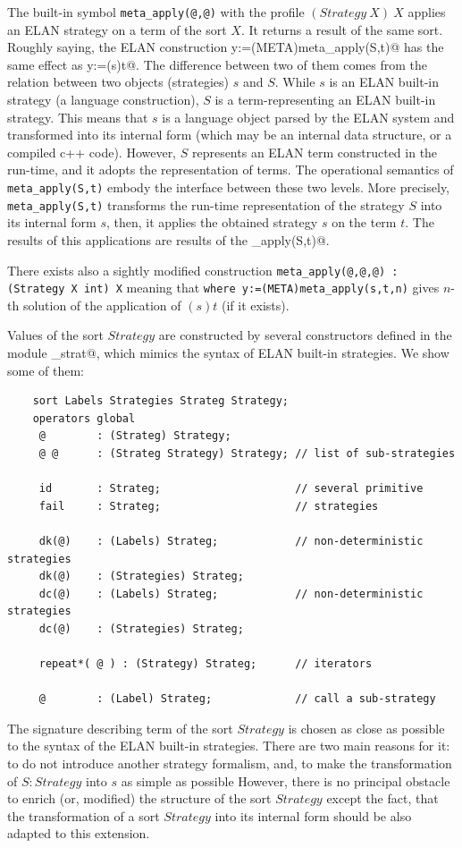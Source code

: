 \documentclass{article}
\begin{document}
    The built-in symbol \verb|meta_apply(@,@)| with the profile
    $(Strategy~X)~ X$ applies
    an ELAN strategy on a term of the sort $X$.
    It returns a result of the same sort.
    Roughly saying, the ELAN construction
    \verb@where y:=(META)meta_apply(S,t)@
    has the same effect as
    \verb@where y:=(s)t@.
    The difference between two of them comes from the relation between
    two objects (strategies) 
    $s$ and $S$. While $s$ is an ELAN built-in strategy
    (a language construction), $S$ is a term-representing an ELAN
    built-in strategy.
    This means that $s$ is a language object parsed by the
    ELAN system and transformed into its internal form
    (which may be
    an internal data structure, or a compiled c++ code).
    However, $S$ represents an ELAN term constructed
    in the run-time, and it adopts the representation of terms.
    The operational semantics of
    \verb|meta_apply(S,t)| embody the interface between these two levels.
    More precisely, \verb|meta_apply(S,t)| transforms the run-time
    representation of the strategy $S$ into its internal form $s$,
    then, it applies the obtained strategy $s$ on the term $t$. The results of
    this applications are results of the \verb@meta_apply(S,t)@.

    There exists also a sightly modified construction
    \verb|meta_apply(@,@,@) : (Strategy X int) X|
    meaning that 
    \verb|where y:=(META)meta_apply(s,t,n)| gives $n$-th solution
    of the application of $(s)t$ (if it exists).

    Values of the sort $Strategy$ are constructed by several constructors
    defined in the module \verb@Meta_strat@,
    which mimics the syntax of ELAN built-in strategies.
    We show some of them:
    {\small
    \begin{verbatim}
    sort Labels Strategies Strateg Strategy;
    operators global
     @        : (Strateg) Strategy;
     @ @      : (Strateg Strategy) Strategy; // list of sub-strategies

     id       : Strateg;                     // several primitive
     fail     : Strateg;                     // strategies

     dk(@)    : (Labels) Strateg;            // non-deterministic strategies
     dk(@)    : (Strategies) Strateg;           
     dc(@)    : (Labels) Strateg;            // non-deterministic strategies
     dc(@)    : (Strategies) Strateg;         

     repeat*( @ ) : (Strategy) Strateg;      // iterators

     @        : (Label) Strateg;             // call a sub-strategy
     \end{verbatim} }
     The signature describing term of the sort $Strategy$ is chosen
     as close as possible to the syntax of the ELAN built-in strategies.
     There are two main reasons for it:
         to do not introduce another strategy formalism, and,
         to make the transformation of $S:Strategy$ into $s$ as simple as possible
     However, there is no principal
     obstacle to enrich (or, modified) the structure of the sort $Strategy$
     except the fact, that the transformation of a sort $Strategy$ into its
     internal form should be also adapted to this extension.
\end{document}
